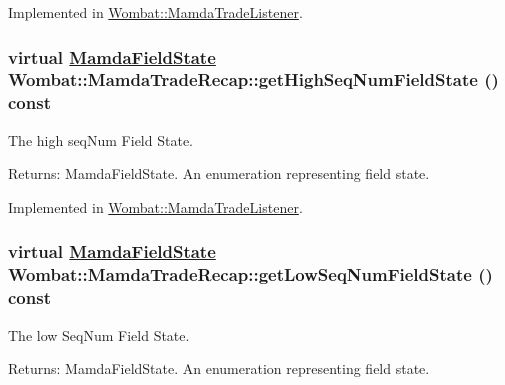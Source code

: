 Implemented in \hyperlink{classWombat_1_1MamdaTradeListener_3bd3e58f99dcb1456e393d3c204a8ce9}{Wombat::Mamda\-Trade\-Listener}.\hypertarget{classWombat_1_1MamdaTradeRecap_6553b87e01893b7740590f0b079ca87f}{
\subsubsection[getHighSeqNumFieldState]{\setlength{\rightskip}{0pt plus 5cm}virtual \hyperlink{namespaceWombat_93aac974f2ab713554fd12a1fa3b7d2a}{Mamda\-Field\-State} Wombat::Mamda\-Trade\-Recap::get\-High\-Seq\-Num\-Field\-State () const}}
\label{classWombat_1_1MamdaTradeRecap_6553b87e01893b7740590f0b079ca87f}


The high seq\-Num Field State. 

\begin{Desc}
\item[Returns:]Mamda\-Field\-State. An enumeration representing field state. \end{Desc}


Implemented in \hyperlink{classWombat_1_1MamdaTradeListener_50fb169b697c0c3d26516b13f864db80}{Wombat::Mamda\-Trade\-Listener}.\hypertarget{classWombat_1_1MamdaTradeRecap_faa2d571451bc8a124a85a00e67f6fef}{
\subsubsection[getLowSeqNumFieldState]{\setlength{\rightskip}{0pt plus 5cm}virtual \hyperlink{namespaceWombat_93aac974f2ab713554fd12a1fa3b7d2a}{Mamda\-Field\-State} Wombat::Mamda\-Trade\-Recap::get\-Low\-Seq\-Num\-Field\-State () const}}
\label{classWombat_1_1MamdaTradeRecap_faa2d571451bc8a124a85a00e67f6fef}


The low Seq\-Num Field State. 

\begin{Desc}
\item[Returns:]Mamda\-Field\-State. An enumeration representing field state. \end{Desc}


